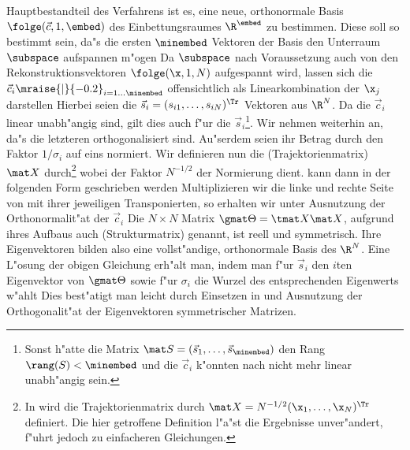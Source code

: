 Hauptbestandteil des Verfahrens ist es, eine neue, orthonormale Basis $\folge(\vec
c,1,\embed)$ des Einbettungsraumes $\R^\embed$ zu bestimmen. Diese soll so bestimmt sein,
da"s die ersten $\minembed$ Vektoren der Basis den Unterraum $\subspace$ aufspannen m"ogen
 Da $\subspace$ nach
Voraussetzung auch von den Rekonstruktionsvektoren $\folge(\x,1,N)$ aufgespannt wird,
lassen sich die $\vec c_i\mraise{\rvert}{-0.2}_{i=1\dots\minembed}$ offensichtlich als
Linearkombination der $\x_j$ darstellen 
Hierbei seien die $\vec s_i = (s_{i1},\dots,s_{iN})^\Tr$
Vektoren aus $\R^N$. Da die $\vec c_i$ linear unabh"angig sind, gilt dies auch f"ur die
$\vec s_i$\footnote{Sonst h"atte die Matrix $\mat S=(\vec s_1,\dots,\vec s_\minembed)$ den
  Rang $\rang(S)<\minembed$ und die $\vec c_i$ k"onnten nach  nicht mehr
  linear unabh"angig sein.}. Wir nehmen weiterhin an, da"s die letzteren orthogonalisiert
sind. Au"serdem seien ihr Betrag durch den Faktor $1/\sigma_i$ auf eins normiert.  Wir
definieren nun die \begriff(Trajektorienmatrix) $\mat X$ durch\footnote{In
  \cite{broomhead-king} wird die Trajektorienmatrix durch $\mat X = N^{-1/2}(\x_1, \dots,
  \x_N)^\Tr$ definiert. Die hier getroffene Definition l"a"st die Ergebnisse unver"andert,
  f"uhrt jedoch zu einfacheren Gleichungen.}  
wobei der Faktor $N^{-1/2}$ der Normierung dient.   kann dann in der
folgenden Form geschrieben werden 
Multiplizieren wir die linke und rechte Seite von  mit ihrer jeweiligen
Transponierten, so erhalten wir unter Ausnutzung der Orthonormalit"at der $\vec c_i$
Die $N\times N$ Matrix $\gmat \Theta = \tmat X \mat X$, aufgrund ihres Aufbaus auch
\begriff(Strukturmatrix) genannt, ist reell und symmetrisch. Ihre
Eigenvektoren bilden also eine vollst"andige, orthonormale Basis des $\R^N$. 
Eine L"osung der obigen Gleichung erh"alt man, indem man f"ur $\vec s_i$ 
den $i$ten Eigenvektor von $\gmat \Theta$ sowie f"ur $\sigma_i$ die Wurzel des entsprechenden Eigenwerts w"ahlt
Dies best"atigt man leicht durch Einsetzen in  und Ausnutzung der Orthogonalit"at der
Eigenvektoren symmetrischer Matrizen. 

